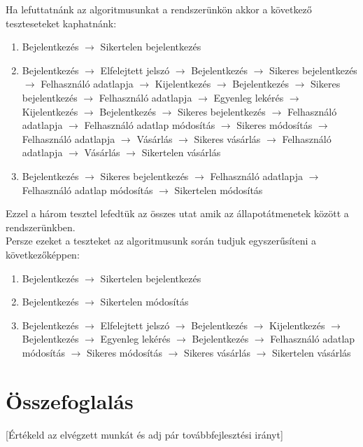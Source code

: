 \documentclass[12pt]{article}
\begin{document}
Ha lefuttatnánk az algoritmusunkat a rendszerünkön akkor a következő teszteseteket kaphatnánk:
\begin{enumerate}
\item Bejelentkezés $\rightarrow$ Sikertelen bejelentkezés
\item Bejelentkezés $\rightarrow$ Elfelejtett jelszó $\rightarrow$ Bejelentkezés $\rightarrow$ Sikeres bejelentkezés $\rightarrow$ Felhasználó adatlapja $\rightarrow$ Kijelentkezés $\rightarrow$ Bejelentkezés $\rightarrow$ Sikeres bejelentkezés $\rightarrow$ Felhasználó adatlapja $\rightarrow$ Egyenleg lekérés $\rightarrow$ Kijelentkezés $\rightarrow$ Bejelentkezés $\rightarrow$ Sikeres bejelentkezés $\rightarrow$ Felhasználó adatlapja $\rightarrow$ Felhasználó adatlap módosítás $\rightarrow$ Sikeres módosítás $\rightarrow$ Felhasználó adatlapja $\rightarrow$ Vásárlás $\rightarrow$ Sikeres vásárlás $\rightarrow$ Felhasználó adatlapja $\rightarrow$ Vásárlás $\rightarrow$ Sikertelen vásárlás
\item Bejelentkezés $\rightarrow$ Sikeres bejelentkezés $\rightarrow$ Felhasználó adatlapja $\rightarrow$ Felhasználó adatlap módosítás $\rightarrow$ Sikertelen módosítás
\end{enumerate}

Ezzel a három tesztel lefedtük az összes utat amik az állapotátmenetek között a rendszerünkben.\\

Persze ezeket a teszteket az algoritmusunk során tudjuk egyszerűsíteni a következőképpen:
\begin{enumerate}
\item Bejelentkezés $\rightarrow$ Sikertelen bejelentkezés
\item Bejelentkezés $\rightarrow$ Sikertelen módosítás
\item Bejelentkezés $\rightarrow$ Elfelejtett jelszó $\rightarrow$ Bejelentkezés $\rightarrow$ Kijelentkezés $\rightarrow$ Bejelentkezés $\rightarrow$ Egyenleg lekérés $\rightarrow$ Bejelentkezés $\rightarrow$ Felhasználó adatlap módosítás $\rightarrow$ Sikeres módosítás $\rightarrow$ Sikeres vásárlás $\rightarrow$ Sikertelen vásárlás
\end{enumerate}


\section{Összefoglalás}
[Értékeld az elvégzett munkát és adj pár továbbfejlesztési irányt]


\pagebreak

\newpage


\end{document}

